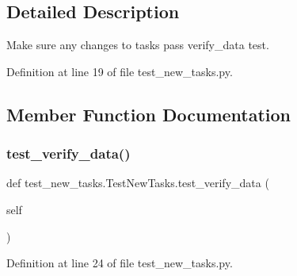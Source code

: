 \subsection{Detailed Description}
\begin{DoxyVerb}Make sure any changes to tasks pass verify_data test.
\end{DoxyVerb}
 

Definition at line 19 of file test\+\_\+new\+\_\+tasks.\+py.



\subsection{Member Function Documentation}
\mbox{\label{classtest__new__tasks_1_1TestNewTasks_af52063eb5d4e045a1546f00c3ded043a}} 
\subsubsection{\texorpdfstring{test\+\_\+verify\+\_\+data()}{test\_verify\_data()}}
{\footnotesize\ttfamily def test\+\_\+new\+\_\+tasks.\+Test\+New\+Tasks.\+test\+\_\+verify\+\_\+data (\begin{DoxyParamCaption}\item[{}]{self }\end{DoxyParamCaption})}



Definition at line 24 of file test\+\_\+new\+\_\+tasks.\+py.


